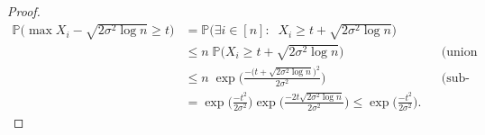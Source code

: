 \documentclass[]{article}
\begin{document}
\begin{proof}
	\begin{align*}
		\mathbb{P}\Big(\max X_i -\sqrt{2\sigma^2\log n} \geq t\Big) &= \mathbb{P}\Big( \exists i\in[n]:\;\; X_i \geq t + \sqrt{2\sigma^2\log n} \Big)\\		
		&\leq n\; \mathbb{P}\Big( X_i \geq t + \sqrt{2\sigma^2\log n} \Big) && \text{(union bound)}\\
		&\leq n\; \exp\bigg(\frac{-\big(t + \sqrt{2\sigma^2\log n}\big)^2}{2\sigma^2}\bigg) && \text{(sub-gaussian tail)}\\
		&= \exp\bigg(\frac{-t^2}{2\sigma^2}\bigg)\exp\bigg(\frac{-2t \sqrt{2\sigma^2\log n}}{2\sigma^2}\bigg)\leq \exp\bigg(\frac{-t^2}{2\sigma^2}\bigg).
	\end{align*}
	
\end{proof}



		
\end{document}
